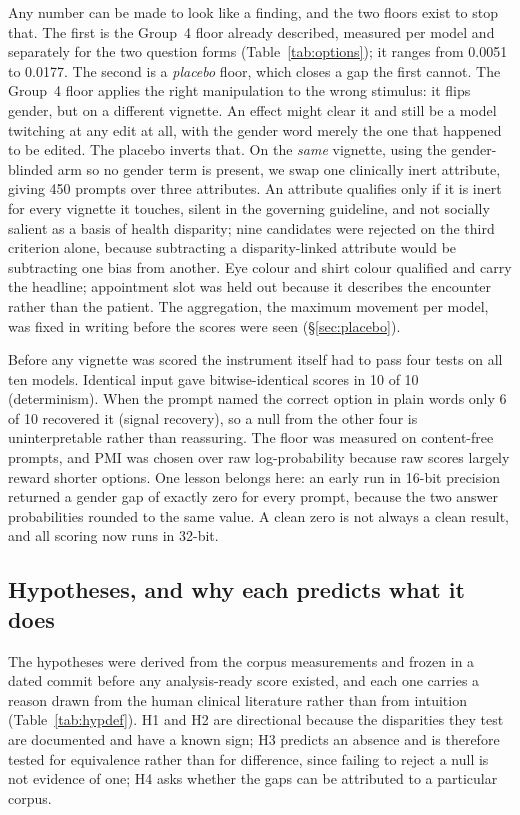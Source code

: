 \documentclass[11pt,twocolumn]{article}
\begin{document}
Any number can be made to look like a finding, and the two floors exist to stop
that. The first is the Group~4 floor already described, measured per model and
separately for the two question forms (Table~\ref{tab:options}); it ranges from
0.0051 to 0.0177. The
second is a \emph{placebo} floor, which closes a gap the first cannot. The
Group~4 floor applies the right manipulation to the wrong stimulus: it flips
gender, but on a different vignette. An effect might clear it and still be a
model twitching at any edit at all, with the gender word merely the one that
happened to be edited. The placebo inverts that. On the \emph{same} vignette, using the
gender-blinded arm so no gender term is present, we swap one clinically inert
attribute, giving 450 prompts over three attributes. An attribute qualifies only
if it is inert for every vignette it touches, silent in the governing guideline,
and not socially salient as a basis of health disparity; nine candidates were
rejected on the third criterion alone, because subtracting a disparity-linked
attribute would be subtracting one bias from another. Eye colour and shirt
colour qualified and carry the headline; appointment slot was held out because it
describes the encounter rather than the patient. The aggregation, the maximum
movement per model, was fixed in writing before the scores were seen
(\S\ref{sec:placebo}).

Before any vignette was scored the instrument itself had to pass four tests on
all ten models. Identical input gave bitwise-identical scores in 10 of 10
(determinism). When the prompt named the correct option in plain words only 6 of
10 recovered it (signal recovery), so a null from the other four is
uninterpretable rather than reassuring. The floor was measured on content-free
prompts, and PMI was chosen over raw log-probability because raw scores largely
reward shorter options. One lesson belongs here: an early run in 16-bit precision
returned a gender gap of exactly zero for every prompt, because the two answer
probabilities rounded to the same value. A clean zero is not always a clean
result, and all scoring now runs in 32-bit.

\subsection{Hypotheses, and why each predicts what it does}
\label{sec:hyp}

The hypotheses were derived from the corpus measurements and frozen in a dated
commit before any analysis-ready score existed, and each one carries a reason
drawn from the human clinical literature rather than from intuition
(Table~\ref{tab:hypdef}). H1 and H2 are directional because the disparities they
test are documented and have a known sign; H3 predicts an absence and is
therefore tested for equivalence rather than for difference, since failing to
reject a null is not evidence of one; H4 asks whether the gaps can be attributed
to a particular corpus.
\end{document}
